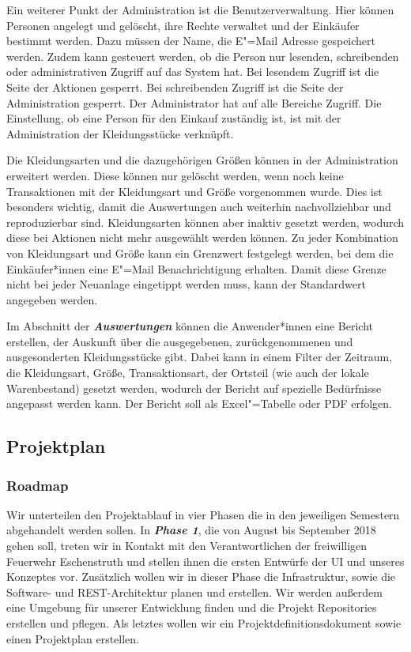 Ein weiterer Punkt der Administration ist die Benutzerverwaltung. Hier können Personen angelegt und gelöscht, ihre Rechte verwaltet und der Einkäufer bestimmt werden. Dazu müssen der Name, die E"=Mail Adresse gespeichert werden. Zudem kann gesteuert werden, ob die Person nur lesenden, schreibenden oder administrativen Zugriff auf das System hat. Bei lesendem Zugriff ist die Seite der Aktionen gesperrt. Bei schreibenden Zugriff ist die Seite der Administration gesperrt. Der Administrator hat auf alle Bereiche Zugriff. Die Einstellung, ob eine Person für den Einkauf zuständig ist, ist mit der Administration der Kleidungsstücke verknüpft. 

Die Kleidungsarten und die dazugehörigen Größen können in der Administration erweitert werden. Diese können nur gelöscht werden, wenn noch keine Transaktionen mit der Kleidungsart und Größe vorgenommen wurde. Dies ist besonders wichtig, damit die Auswertungen auch weiterhin nachvollziehbar und reproduzierbar sind. Kleidungsarten können aber inaktiv gesetzt werden, wodurch diese bei Aktionen nicht mehr ausgewählt werden können. Zu jeder Kombination von Kleidungsart und Größe kann ein Grenzwert festgelegt werden, bei dem die Einkäufer*innen eine E"=Mail Benachrichtigung erhalten. Damit diese Grenze nicht bei jeder Neuanlage eingetippt werden muss, kann der Standardwert angegeben werden.

Im Abschnitt der \textit{\textbf{Auswertungen}} können die Anwender*innen eine Bericht erstellen, der Auskunft über die ausgegebenen, zurückgenommenen und ausgesonderten Kleidungsstücke gibt. Dabei kann in einem Filter der Zeitraum, die Kleidungsart, Größe, Transaktionsart, der Ortsteil (wie auch der lokale Warenbestand) gesetzt werden, wodurch der Bericht auf spezielle Bedürfnisse angepasst werden kann. Der Bericht soll als Excel"=Tabelle oder PDF erfolgen.

\subsection{Projektplan}
\subsubsection{Roadmap}\label{sec:roadmap}

Wir unterteilen den Projektablauf in vier Phasen die in den jeweiligen Semestern abgehandelt werden sollen. In \textit{\textbf{Phase 1}}, die von August bis September 2018 gehen soll, treten wir in Kontakt mit den Verantwortlichen der freiwilligen Feuerwehr Eschenstruth und stellen ihnen die ersten Entwürfe der UI und unseres Konzeptes vor.
Zusätzlich wollen wir in dieser Phase die Infrastruktur, sowie die Software- und REST-Architektur planen und erstellen. Wir werden außerdem eine Umgebung für unserer Entwicklung finden und die Projekt Repositories erstellen und pflegen.
Als letztes wollen wir ein Projektdefinitionsdokument sowie einen Projektplan erstellen.

